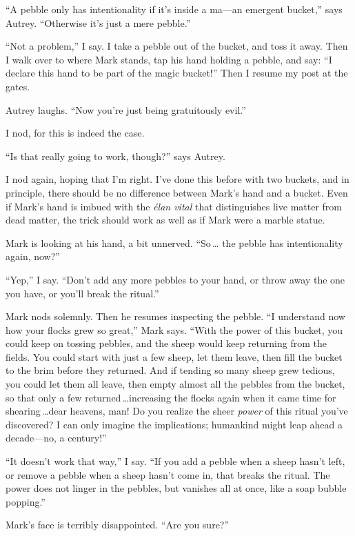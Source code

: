 {
 ``A pebble only has intentionality if
it's inside a ma---an emergent
bucket,'' says Autrey. ``Otherwise
it's just a mere pebble.''}

{
 ``Not a problem,'' I say. I
take a pebble out of the bucket, and toss it away. Then I walk over to
where Mark stands, tap his hand holding a pebble, and say:
``I declare this hand to be part of the magic
bucket!'' Then I resume my post at the gates.}

{
 Autrey laughs. ``Now you're just
being gratuitously evil.''}

{
 I nod, for this is indeed the case.}

{
 ``Is that really going to work,
though?'' says Autrey.}

{
 I nod again, hoping that I'm right.
I've done this before with two buckets, and in
principle, there should be no difference between Mark's
hand and a bucket. Even if Mark's hand is imbued with
the \textit{élan vital} that distinguishes live matter from dead
matter, the trick should work as well as if Mark were a marble statue.}

{
  Mark is looking at his hand, a bit unnerved. ``So\,\ldots
  the pebble has intentionality again, now?''}

{
 ``Yep,'' I say.
``Don't add any more pebbles to your
hand, or throw away the one you have, or you'll break
the ritual.''}

{
 Mark nods solemnly. Then he resumes inspecting the pebble.
``I understand now how your flocks grew so
great,'' Mark says. ``With the power
of this bucket, you could keep on tossing pebbles, and the sheep would
keep returning from the fields. You could start with just a few sheep,
let them leave, then fill the bucket to the brim before they returned.
And if tending so many sheep grew tedious, you could let them all
leave, then empty almost all the pebbles from the bucket, so that only
a few returned\,\ldots increasing the flocks again when it came time for
shearing\,\ldots dear heavens, man! Do you realize the sheer
\textit{power} of this ritual you've discovered? I can
only imagine the implications; humankind might leap ahead a
decade---no, a century!''}

{
 ``It doesn't work that
way,'' I say. ``If you add a pebble
when a sheep hasn't left, or remove a pebble when a
sheep hasn't come in, that breaks the ritual. The power
does not linger in the pebbles, but vanishes all at once, like a soap
bubble popping.''}

{
 Mark's face is terribly disappointed.
``Are you sure?''}

